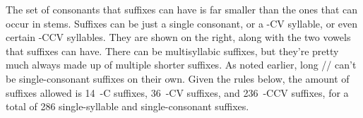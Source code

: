 The
%
%
set of consonants that suffixes can have is far smaller than the ones that can
occur in stems. Suffixes can be just a single consonant, or a -CV syllable, or
even certain -CCV syllables. They are shown on the right, along with the two
vowels that suffixes can have. There can be multisyllabic suffixes, but they're
pretty much always made up of multiple shorter suffixes. As noted earlier, long
\mbox{//} can't be single-consonant suffixes on their own.
Given the rules below, the amount of suffixes allowed is 14~-C suffixes, 36~-CV
suffixes, and 236~-CCV suffixes, for a total of 286 single-syllable and
single-consonant suffixes.

